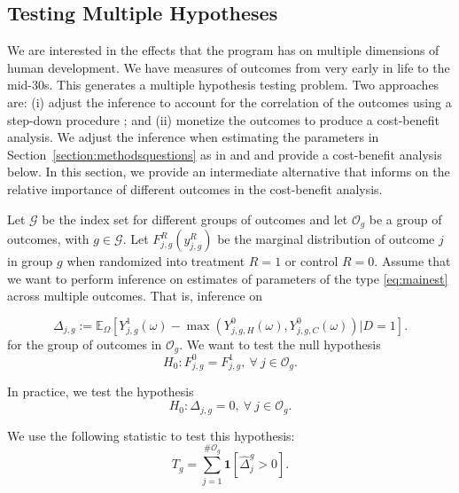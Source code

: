 \subsection{Testing Multiple Hypotheses}  \label{section:counts}

We are interested in the effects that the program has on multiple dimensions of human development. We have measures of outcomes from very early in life to the mid-30s. This generates a multiple hypothesis testing problem. Two approaches are: (i) adjust the inference to account for the correlation of the outcomes using a step-down procedure \citep{Lehman_Romano_2005_AnnStat,Romano_Shaikh_2006_AnnStat}; and (ii) monetize the outcomes to produce a cost-benefit analysis. We adjust the inference when estimating the parameters in Section~\ref{section:methodsquestions} as in \citet{Lehman_Romano_2005_AnnStat} and \citet{Romano_Shaikh_2006_AnnStat} and provide a cost-benefit analysis below. In this section, we provide an intermediate alternative that informs on the relative importance of different outcomes in the cost-benefit analysis.

Let $\mathcal{G}$ be the index set for different groups of outcomes and let $\mathcal{O}_{g}$ be a group of outcomes, with $g \in \mathcal{G}$. Let $F_{j,g}^R \left( y_{j,g}^R \right) $ be the marginal distribution of outcome $j$ in group $g$ when randomized into treatment $R = 1$ or control $R = 0$. Assume that we want to perform inference on estimates of parameters of the type \eqref{eq:mainest} across multiple outcomes. That is, inference on

\begin{equation}
\Delta_{j,g} := \mathbb{E}_{\Omega} \left[ Y_{j,g}^1 \left( \omega \right) -  \max \left(  Y_{j,g,H}^0 \left( \omega \right) ,  Y_{j,g,C}^0 \left( \omega \right)  \right) | D =1 \right].
\end{equation}
for the group of outcomes in $\mathcal{O}_{g}$. We want to test the null hypothesis
\begin{equation}
H_{0} : F_{j,g}^0 = F_{j,g}^1, \ \forall \ j \in \mathcal{O}_{g}.
\end{equation}

In practice, we test the hypothesis
\begin{equation}
H_{0} : \Delta_{j,g} = 0, \ \forall \ j \in \mathcal{O}_{g}.
\end{equation}

We use the following statistic to test this hypothesis:
\begin{equation}
T_{g} = \sum _{j=1}^{\# \mathcal{O}_g} \mathbf{1} \left[ \widehat{\Delta}_{j}^{g} > 0\right]. \label{eq:count}
\end{equation}

